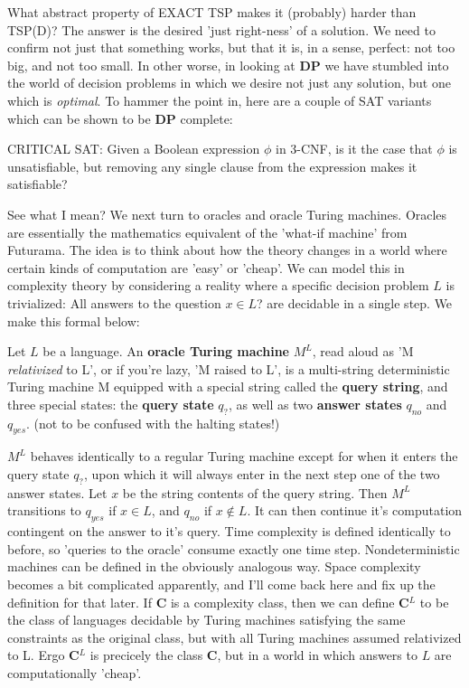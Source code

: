 \par What abstract property of EXACT TSP makes it (probably) harder than TSP(D)? The answer is the desired 'just right-ness' of a solution. We need to confirm not just that something works, but that it is, in a sense, perfect: not too big, and not too small. In other worse, in looking at \textbf{DP} we have stumbled into the world of decision problems in which we desire not just any solution, but one which is \textit{optimal}. To hammer the point in, here are a couple of SAT variants which can be shown to be \textbf{DP} complete:
\begin{problem}
    CRITICAL SAT: Given a Boolean expression $\phi$ in 3-CNF, is it the case that $\phi$ is unsatisfiable, but removing any single clause from the expression makes it satisfiable?
\end{problem}
See what I mean?
We next turn to oracles and oracle Turing machines. Oracles are essentially the mathematics equivalent of the 'what-if machine' from Futurama. The idea is to think about how the theory changes in a world where certain kinds of computation are 'easy' or 'cheap'. We can model this in complexity theory by considering a reality where a specific decision problem $L$ is trivialized: All answers to the question $x \in L$? are decidable in a single step. We make this formal below:
\begin{definition}
    Let $L$ be a language. An \textbf{oracle Turing machine} $M^L$, read aloud as 'M \textit{relativized} to L', or if you're lazy, 'M raised to L', is a multi-string deterministic Turing machine M equipped with a special string called the \textbf{query string}, and three special states: the \textbf{query state} $q_?$, as well as two \textbf{answer states} $q_{no}$ and $q_{yes}$. (not to be confused with the halting states!)
    \par $M^L$ behaves identically to a regular Turing machine except for when it enters the query state $q_?$, upon which it will always enter in the next step one of the two answer states. Let $x$ be the string contents of the query string. Then $M^L$ transitions to $q_{yes}$ if $x \in L$, and $q_{no}$ if $x \notin L$. It can then continue it's computation contingent on the answer to it's query. Time complexity is defined identically to before, so 'queries to the oracle' consume exactly one time step. Nondeterministic machines can be defined in the obviously analogous way. Space complexity becomes a bit complicated apparently, and I'll come back here and fix up the definition for that later. If \textbf{C} is a complexity class, then we can define \textbf{C}$^L$ to be the class of languages decidable by Turing machines satisfying the same constraints as the original class, but with all Turing machines assumed relativized to L. Ergo \textbf{C}$^L$ is precicely the class \textbf{C}, but in a world in which answers to $L$ are computationally 'cheap'.
\end{definition}
